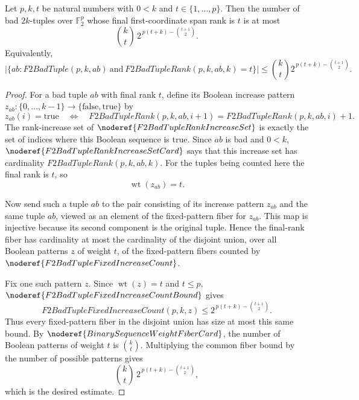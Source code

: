 \begin{helper}
Let \(p,k,t\) be natural numbers with \(0<k\) and \(t\in\{1,\ldots,p\}\).
Then the number of bad \(2k\)-tuples over \(\mathbb F_2^p\) whose final
first-coordinate span rank is \(t\) is at most
\[
  \binom{k}{t}\,
  2^{\,p(t+k)-\binom{t+1}{2}}.
\]
Equivalently,
\[
\left|\{ab:F2BadTuple(p,k,ab)\ \text{and}\
  F2BadTupleRank(p,k,ab,k)=t\}\right|
\le
\binom{k}{t}2^{\,p(t+k)-\binom{t+1}{2}}.
\]
\end{helper}
\begin{proof}
For a bad tuple \(ab\) with final rank \(t\), define its Boolean increase
pattern \(z_{ab}:\{0,\ldots,k-1\}\to\{\mathrm{false},\mathrm{true}\}\) by
\[
  z_{ab}(i)=\mathrm{true}
  \quad\Longleftrightarrow\quad
  F2BadTupleRank(p,k,ab,i+1)=F2BadTupleRank(p,k,ab,i)+1.
\]
The rank-increase set of \(\noderef{F2BadTupleRankIncreaseSet}\) is exactly
the set of indices where this Boolean sequence is true. Since \(ab\) is bad
and \(0<k\), \(\noderef{F2BadTupleRankIncreaseSetCard}\) says that this
increase set has cardinality \(F2BadTupleRank(p,k,ab,k)\). For the tuples
being counted here the final rank is \(t\), so
\[
  \operatorname{wt}(z_{ab})=t.
\]

Now send such a tuple \(ab\) to the pair consisting of its increase pattern
\(z_{ab}\) and the same tuple \(ab\), viewed as an element of the fixed-pattern
fiber for \(z_{ab}\). This map is injective because its second component is
the original tuple. Hence the final-rank fiber has cardinality at most the
cardinality of the disjoint union, over all Boolean patterns \(z\) of weight
\(t\), of the fixed-pattern fibers counted by
\(\noderef{F2BadTupleFixedIncreaseCount}\).

Fix one such pattern \(z\). Since \(\operatorname{wt}(z)=t\) and \(t\le p\),
\(\noderef{F2BadTupleFixedIncreaseCountBound}\) gives
\[
  F2BadTupleFixedIncreaseCount(p,k,z)
  \le
  2^{\,p(t+k)-\binom{t+1}{2}}.
\]
Thus every fixed-pattern fiber in the disjoint union has size at most this
same bound. By \(\noderef{BinarySequenceWeightFiberCard}\), the number of
Boolean patterns of weight \(t\) is \(\binom{k}{t}\). Multiplying the common
fiber bound by the number of possible patterns gives
\[
  \binom{k}{t}\,
  2^{\,p(t+k)-\binom{t+1}{2}},
\]
which is the desired estimate.
\end{proof}
